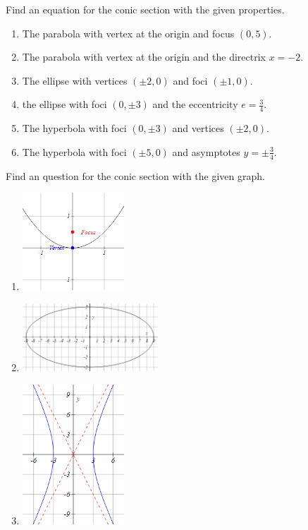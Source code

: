 \begin{exercise}
    Find an equation for
    the conic section with the given properties.
    \begin{enumerate}
        \item The parabola with vertex at the origin and focus $(0, 5)$.
        \item The parabola with vertex at the origin and the directrix $x=-2$.
        \item The ellipse with vertices $(\pm 2, 0)$ and foci $(\pm 1, 0)$.
        \item the ellipse with foci $(0,\pm 3)$ and the eccentricity $e=\frac34$.
        \item The hyperbola with foci $(0,\pm 3)$ and vertices $(\pm 2, 0)$.
        \item The hyperbola with foci $(\pm 5, 0)$ and asymptotes $y=\pm\frac34$.
    \end{enumerate}
\end{exercise}

\begin{exercise}
    Find an question for the conic section with the given graph.
    \begin{enumerate}
        \item \mbox{}

        \includegraphics[width=0.3\textwidth]{figs/ParabolaEqFromGraph.png}
        \item \mbox{}

        \includegraphics[width=0.4\textwidth]{figs/EllipseEqFromGraph.png}
        \item\mbox{}

        \includegraphics[width=0.3\textwidth]{figs/HyperbolaEqFromGraph.png}
    \end{enumerate}
\end{exercise}

